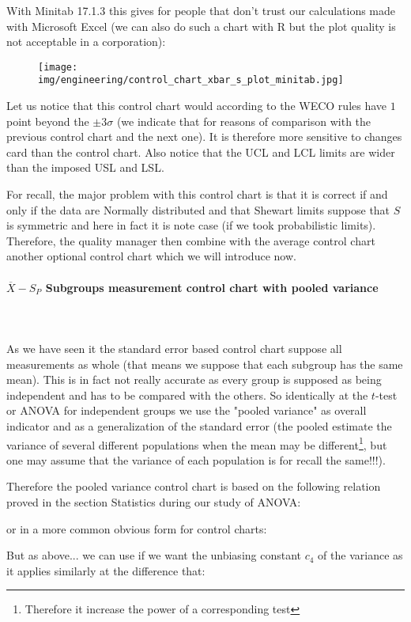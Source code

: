 	With Minitab 17.1.3 this gives for people that don't trust our calculations made with Microsoft Excel (we can also do such a chart with R but the plot quality is not acceptable in a corporation):
	\begin{figure}[H]
		\centering
		\texttt{[image: img/engineering/control\_chart\_xbar\_s\_plot\_minitab.jpg]}
	\end{figure}
	Let us notice that this control chart would according to the WECO rules have $1$ point beyond the $\pm 3\sigma$ (we indicate that for reasons of comparison with the previous control chart and the next one). It is therefore more sensitive to changes card than the control chart. Also notice that the UCL and LCL limits are wider than the imposed USL and LSL.
	
	For recall, the major problem with this control chart is that it is correct if and only if the data are Normally distributed and that Shewart limits suppose that $S$ is symmetric and here in fact it is note case (if we took probabilistic limits). Therefore, the quality manager then combine with the average control chart another optional control chart which we will introduce now.
	
	\paragraph{$\overline{X}-S_P$ Subgroups measurement control chart with pooled variance}\mbox{}\\\\
	As we have seen it the standard error based control chart suppose all measurements as whole (that means we suppose that each subgroup has the same mean). This is in fact not really accurate as every group is supposed as being independent and has to be compared with the others. So  identically at the $t$-test or ANOVA for independent groups we use the "pooled variance" as overall indicator and as a generalization of the standard error (the pooled estimate the variance of several different populations when the mean may be different\footnote{Therefore it increase the power of a corresponding test}, but one may assume that the variance of each population is for recall the same!!!).
	
	Therefore the pooled variance control chart is based on the following relation proved in the section Statistics during our study of ANOVA:
	
	or in a more common obvious form for control charts:
	
	But as above... we can use if we want the unbiasing constant $c_4$ of the variance as it applies similarly at the difference that:
	
